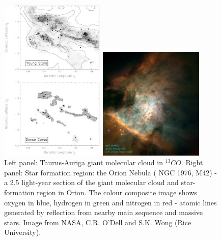 \begin{figure}[t]
\begin{center}
 \begin{minipage}[c]{.48\linewidth}
\includegraphics[width=5cm]{taurus}
 \end{minipage} \hfill
 \begin{minipage}[c]{.48\linewidth}
\includegraphics[width=5cm]{molecular_cloud}
 \end{minipage} \hfill

\caption{
Left panel:
Taurus-Auriga giant molecular cloud in $^{13}CO$.
Right panel: Star formation region: the Orion Nebula ( NGC 1976, M42) - a 2.5 light-year section of the giant molecular cloud and star-formation region in Orion.
The colour composite image shows oxygen in blue, hydrogen in green and nitrogen in red - atomic lines generated by reflection from nearby main sequence and massive stars.
Image from NASA, C.R. O'Dell and S.K. Wong (Rice University).
}
\label{fig:gmc} %
\end{center}
\end{figure}

